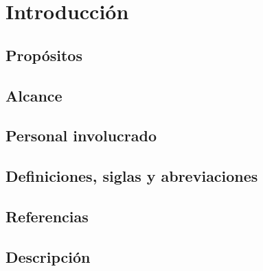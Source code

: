 \chapter{Introducción}

\section{Propósitos}

\section{Alcance}

\section{Personal involucrado}

\section{Definiciones, siglas y abreviaciones}

\section{Referencias}

\section{Descripción}

